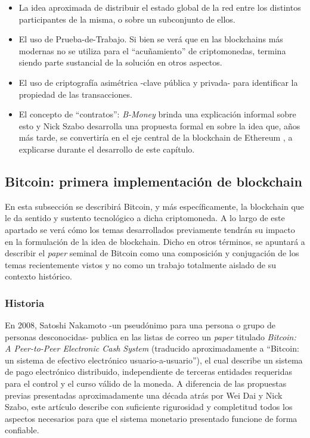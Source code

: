 \begin{itemize}
  \item La idea aproximada de distribuir el estado global de la red entre los distintos participantes de la misma, o sobre un subconjunto de ellos.
  \item El uso de Prueba-de-Trabajo. Si bien se verá que en las blockchains más modernas no se utiliza para el ``acuñamiento'' de criptomonedas, termina siendo parte sustancial de la solución en otros aspectos.
  \item El uso de criptografía asimétrica -clave pública y privada- para identificar la propiedad de las transacciones.
  \item El concepto de ``contratos'': \textit{B-Money} brinda una explicación informal sobre esto y Nick Szabo desarrolla una propuesta formal en \cite{Szabo1997} sobre la idea que, años más tarde, se convertiría en el eje central de la blockchain de Ethereum \cite{Buterin2014}, a explicarse durante el desarrollo de este capítulo.
\end{itemize}


\subsection{Bitcoin: primera implementación de blockchain}

En esta subsección se describirá Bitcoin, y más específicamente, la blockchain que le da sentido y sustento tecnológico a dicha criptomoneda. A lo largo de este apartado se verá cómo los temas desarrollados previamente tendrán su impacto en la formulación de la idea de blockchain. Dicho en otros términos, se apuntará a describir el \textit{paper} seminal de Bitcoin como una composición y conjugación de los temas recientemente vistos y no como un trabajo totalmente aislado de su contexto histórico.

\subsubsection{Historia}

En 2008, Satoshi Nakamoto -un pseudónimo para una persona o grupo de personas desconocidas- publica en las listas de correo un \textit{paper} titulado \textit{Bitcoin: A Peer-to-Peer Electronic Cash System} (traducido aproximadamente a ``Bitcoin: un sistema de efectivo electrónico usuario-a-usuario''), el cual describe un sistema de pago electrónico distribuido, independiente de terceras entidades requeridas para el control y el curso válido de la moneda. A diferencia de las propuestas previas presentadas aproximadamente una década atrás por Wei Dai y Nick Szabo, este artículo describe con suficiente rigurosidad y completitud todos los aspectos necesarios para que el sistema monetario presentado funcione de forma confiable.

